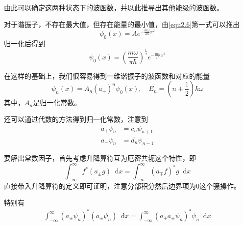 \documentclass[UTF8]{ctexart}
\begin{document}
\noindent 由此可以确定这两种状态下的波函数，并以此推导出其他能级的波函数。

    对于谐振子，不存在最大值，但存在能量的最小值，由\autoref{equ2.6}第一式可以推出
    \begin{equation}
        \psi_{0} (x) = A e^{- \frac{m \omega}{2 \hbar} x^2}
    \end{equation}
\noindent 归一化后得到
\begin{equation}
    \psi_0 (x) = \left(\frac{m \omega}{\pi \hbar}\right)^{\frac{1}{4}} e^{- \frac{m \omega}{2 \hbar} x^2}
\end{equation}

    在这样的基础上，我们很容易得到一维谐振子的波函数和对应的能量
    \begin{equation}
        \psi_n (x)= A_n (a_+)^n \psi_0(x), \quad E_n = \left(n+ \frac{1}{2}\right) \hbar \omega
    \end{equation}
\noindent 其中，$A_n$是归一化常数。

    还可以通过代数的方法得到归一化常数，注意到
    \begin{equation}
        \begin{aligned}
            a_+ \psi_n &= c_n \psi_{n+1} \\
            a_- \psi_n &= d_n \psi_{n-1}
        \end{aligned}
    \end{equation}

    要解出常数因子，首先考虑升降算符互为厄密共轭这个特性，即
    \begin{equation}
        \int_{-\infty}^{\infty} f^* (a_{\pm} g) \mathop{}\!\mathrm{d} x = \int_{-\infty}^{\infty} (a_{\mp} f)^* g \mathop{}\!\mathrm{d} x
    \end{equation}
\noindent 直接带入升降算符的定义即可证明，注意分部积分然后边界项为0这个骚操作。

    特别有
    \begin{equation}
        \begin{aligned}
            \int_{-\infty}^{\infty}\left(a_{\pm} \psi_{n}\right)^{*}\left(a_{\pm} \psi_{n}\right) \mathop{}\!\mathrm{d}  x=\int_{-\infty}^{\infty}\left(a_{\mp} a_{\pm} \psi_{n}\right)^{*} \psi_{n} \mathop{}\!\mathrm{d}  x
        \end{aligned}
    \end{equation}
\end{document}
